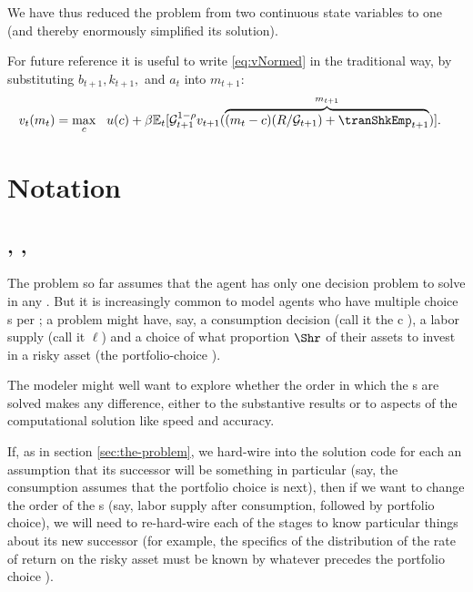 \documentclass[titlepage, headings=optiontotocandhead]{econtex}
\begin{document}
We have thus reduced the problem from two continuous state variables to one (and thereby enormously simplified its solution).

For future reference it is useful to write \eqref{eq:vNormed} in the traditional way, by substituting $b_{t+1},k_{t+1},$ and $a_{t}$ into $m_{t+1}$:
\begin{equation}\begin{gathered}\begin{aligned}
      v_{t}(m_{t}) & = \max_{c} ~~ u(c)+ \beta {\mathbb{E}}_{t}[ \mathcal{G}_{t+1}^{1-\rho}v_{t+1}(\overbrace{(m_{t}-c)(R/\mathcal{G}_{t+1})+\tranShkEmp_{t+1}}^{m_{t+1}})] \label{eq:vusual}.
    \end{aligned}\end{gathered}\end{equation}



\hypertarget{notation}{}
\section{Notation}\label{sec:notation}

\subsection{\Intervals, \Stgs, \Moves}

The problem so far assumes that the agent has only one decision problem to solve in any {\interval}.  But it is increasingly common to model agents who have multiple choice {\stg}s per {\interval}; a problem might have, say, a consumption decision (call it the $\mathrm{c}$ {\stg}), a labor supply {\stg} (call it $\ell$) and a choice of what proportion $\Shr$ of their assets to invest in a risky asset (the portfolio-choice {\stg}).

The modeler might well want to explore whether the order in which the {\stg}s are solved makes any difference, either to the substantive results or to aspects of the computational solution like speed and accuracy.

If, as in section \ref{sec:the-problem}, we hard-wire into the solution code for each {\stg} an assumption that its successor {\stg} will be something in particular (say, the consumption {\stg} assumes that the portfolio choice is next), then if we want to change the order of the {\stg}s (say, labor supply after consumption, followed by portfolio choice), we will need to re-hard-wire each of the stages to know particular things about its new successor (for example, the specifics of the distribution of the rate of return on the risky asset must be known by whatever {\stg} precedes the portfolio choice {\stg}).
\end{document}
